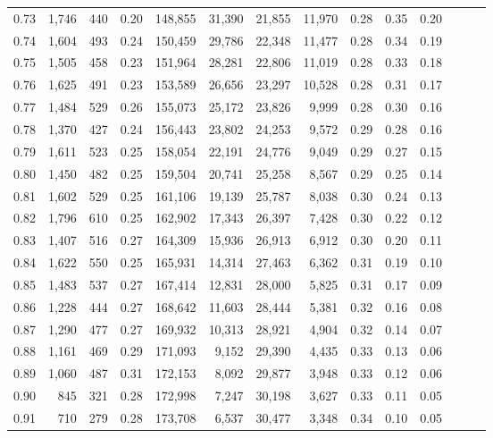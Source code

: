 \begin{tabular}{rrrrrrrrrrrrrr}
0.73 &  1,746 &    440 &  0.20 &  148,855 &   31,390 &  21,855 &  11,970 &  0.28 &  0.35 &      0.20 \\
0.74 &  1,604 &    493 &  0.24 &  150,459 &   29,786 &  22,348 &  11,477 &  0.28 &  0.34 &      0.19 \\
0.75 &  1,505 &    458 &  0.23 &  151,964 &   28,281 &  22,806 &  11,019 &  0.28 &  0.33 &      0.18 \\
0.76 &  1,625 &    491 &  0.23 &  153,589 &   26,656 &  23,297 &  10,528 &  0.28 &  0.31 &      0.17 \\
0.77 &  1,484 &    529 &  0.26 &  155,073 &   25,172 &  23,826 &   9,999 &  0.28 &  0.30 &      0.16 \\
0.78 &  1,370 &    427 &  0.24 &  156,443 &   23,802 &  24,253 &   9,572 &  0.29 &  0.28 &      0.16 \\
0.79 &  1,611 &    523 &  0.25 &  158,054 &   22,191 &  24,776 &   9,049 &  0.29 &  0.27 &      0.15 \\
0.80 &  1,450 &    482 &  0.25 &  159,504 &   20,741 &  25,258 &   8,567 &  0.29 &  0.25 &      0.14 \\
0.81 &  1,602 &    529 &  0.25 &  161,106 &   19,139 &  25,787 &   8,038 &  0.30 &  0.24 &      0.13 \\
0.82 &  1,796 &    610 &  0.25 &  162,902 &   17,343 &  26,397 &   7,428 &  0.30 &  0.22 &      0.12 \\
0.83 &  1,407 &    516 &  0.27 &  164,309 &   15,936 &  26,913 &   6,912 &  0.30 &  0.20 &      0.11 \\
0.84 &  1,622 &    550 &  0.25 &  165,931 &   14,314 &  27,463 &   6,362 &  0.31 &  0.19 &      0.10 \\
0.85 &  1,483 &    537 &  0.27 &  167,414 &   12,831 &  28,000 &   5,825 &  0.31 &  0.17 &      0.09 \\
0.86 &  1,228 &    444 &  0.27 &  168,642 &   11,603 &  28,444 &   5,381 &  0.32 &  0.16 &      0.08 \\
0.87 &  1,290 &    477 &  0.27 &  169,932 &   10,313 &  28,921 &   4,904 &  0.32 &  0.14 &      0.07 \\
0.88 &  1,161 &    469 &  0.29 &  171,093 &    9,152 &  29,390 &   4,435 &  0.33 &  0.13 &      0.06 \\
0.89 &  1,060 &    487 &  0.31 &  172,153 &    8,092 &  29,877 &   3,948 &  0.33 &  0.12 &      0.06 \\
0.90 &    845 &    321 &  0.28 &  172,998 &    7,247 &  30,198 &   3,627 &  0.33 &  0.11 &      0.05 \\
0.91 &    710 &    279 &  0.28 &  173,708 &    6,537 &  30,477 &   3,348 &  0.34 &  0.10 &      0.05 \\

\end{tabular}
